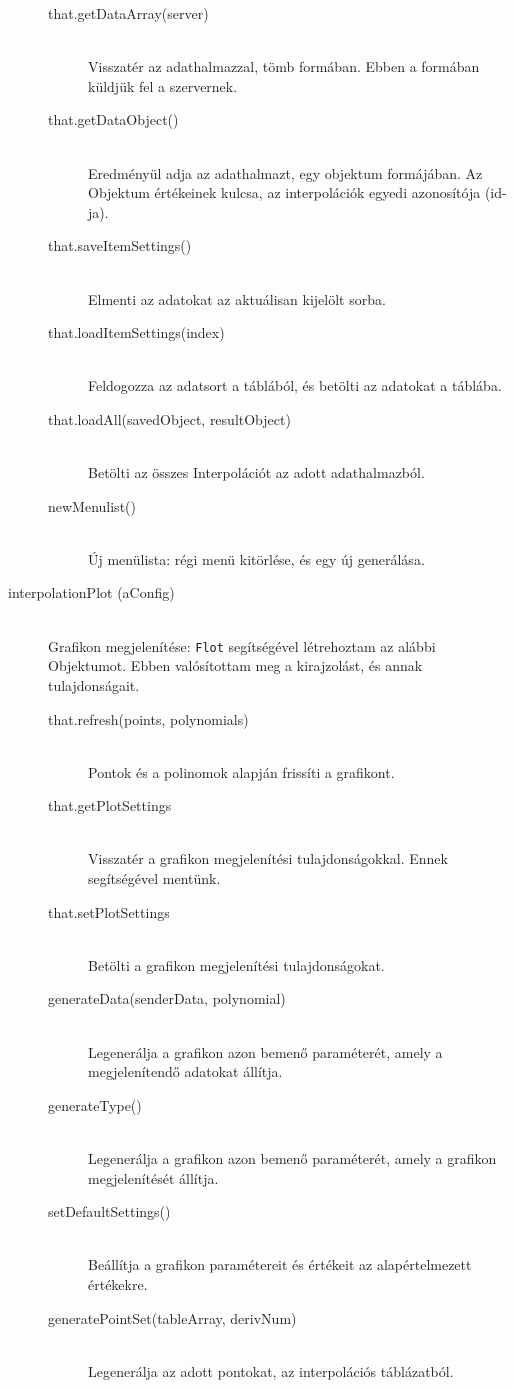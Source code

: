 \begin{description}
\begin{description}
			\item[that.getDataArray(server)] 
			\hfill \\ Visszatér az adathalmazzal, tömb formában. Ebben a formában küldjük fel a szervernek.
			\item[that.getDataObject()] 
			\hfill \\ Eredményül adja az adathalmazt, egy objektum formájában. Az Objektum értékeinek kulcsa, az interpolációk egyedi azonosítója (id-ja).
			\item[that.saveItemSettings()] 
			\hfill \\ Elmenti az adatokat az aktuálisan kijelölt sorba.
			\item[that.loadItemSettings(index)]
			\hfill \\ Feldogozza az adatsort a táblából, és betölti az adatokat a táblába.
			\item[that.loadAll(savedObject, resultObject)] 
			\hfill \\Betölti az összes Interpolációt az adott adathalmazból.
			\item[newMenulist()] 
			\hfill \\
			Új menülista: régi menü kitörlése, és egy új generálása.
			\hfill \\ 
			\end{description}
		\item[interpolationPlot (aConfig)]
			\hfill \\ Grafikon megjelenítése: \texttt{Flot} segítségével létrehoztam az alábbi Objektumot. Ebben valósítottam meg a kirajzolást, és annak tulajdonságait.
			\begin{description}
			\item[that.refresh(points, polynomials)]
			\hfill \\ Pontok és a polinomok alapján frissíti a grafikont.
			\item[that.getPlotSettings]
			\hfill \\ Visszatér a grafikon megjelenítési tulajdonságokkal. Ennek segítségével mentünk.
			\item[that.setPlotSettings]
			\hfill \\ Betölti a grafikon megjelenítési tulajdonságokat.
			\item[generateData(senderData, polynomial)]
			\hfill \\ Legenerálja a grafikon azon bemenő paraméterét, amely a megjelenítendő adatokat állítja.

			\item[generateType()]
			\hfill \\ Legenerálja a grafikon azon bemenő paraméterét, amely a grafikon megjelenítését állítja.
			\item[setDefaultSettings()]
			\hfill \\ Beállítja a grafikon paramétereit és értékeit az alapértelmezett értékekre.
			\item[generatePointSet(tableArray, derivNum)]
			\hfill \\ Legenerálja az adott pontokat, az interpolációs táblázatból.
			\end{description}


\end{description}
